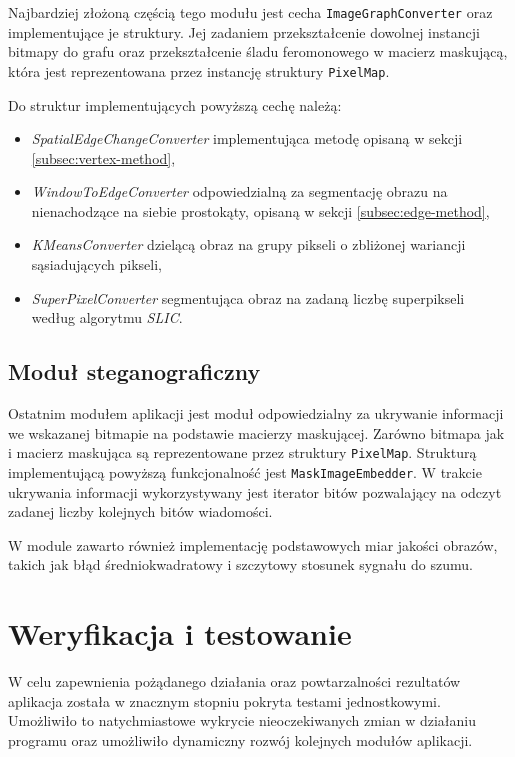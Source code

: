 {{{            Najbardziej złożoną częścią tego modułu jest cecha \texttt{ImageGraphConverter} oraz implementujące je
            struktury. Jej zadaniem przekształcenie dowolnej instancji bitmapy do grafu oraz przekształcenie śladu
            feromonowego w macierz maskującą, która jest reprezentowana przez instancję struktury \texttt{PixelMap}.

            Do struktur implementujących powyższą cechę należą:

            \begin{itemize}
                \item \textit{SpatialEdgeChangeConverter} implementująca metodę opisaną w sekcji
                \ref{subsec:vertex-method},
                \item \textit{WindowToEdgeConverter} odpowiedzialną za segmentację obrazu na nienachodzące na siebie
                prostokąty, opisaną w sekcji \ref{subsec:edge-method},
                \item \textit{KMeansConverter} dzielącą obraz na grupy pikseli o zbliżonej wariancji sąsiadujących pikseli,
                \item \textit{SuperPixelConverter} segmentująca obraz na zadaną liczbę superpikseli według algorytmu
                \textit{SLIC}.
            \end{itemize}
        }

        \subsection{Moduł steganograficzny}
        {
            Ostatnim modułem aplikacji jest moduł odpowiedzialny za ukrywanie informacji we wskazanej bitmapie na
            podstawie macierzy maskującej. Zarówno bitmapa jak i macierz maskująca są reprezentowane przez struktury
            \texttt{PixelMap}. Strukturą implementującą powyższą funkcjonalność jest \texttt{MaskImageEmbedder}. W
            trakcie ukrywania informacji wykorzystywany jest iterator bitów pozwalający na odczyt zadanej liczby
            kolejnych bitów wiadomości.

            W module zawarto również implementację podstawowych miar jakości obrazów, takich jak błąd średniokwadratowy
            i szczytowy stosunek sygnału do szumu.
        }
    }



    \section{Weryfikacja i testowanie}
    {
        W celu zapewnienia pożądanego działania oraz powtarzalności rezultatów aplikacja została w znacznym stopniu
        pokryta testami jednostkowymi. Umożliwiło to natychmiastowe wykrycie nieoczekiwanych zmian w działaniu programu
        oraz umożliwiło dynamiczny rozwój kolejnych modułów aplikacji.

}}
